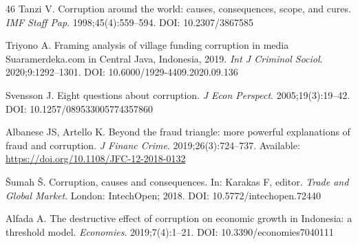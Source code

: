 \documentclass[3p,times,procedia]{elsarticle}
\begin{document}
\begin{thebibliography}{46}
Tanzi V. Corruption around the world: causes, consequences, scope, and cures. \textit{IMF Staff Pap}. 1998;45(4):559--594. DOI: 10.2307/3867585

Triyono A. Framing analysis of village funding corruption in media Suaramerdeka.com in Central Java, Indonesia, 2019. \textit{Int J Criminol Sociol}. 2020;9:1292--1301. DOI: 10.6000/1929-4409.2020.09.136

Svensson J. Eight questions about corruption. \textit{J Econ Perspect}. 2005;19(3):19--42. DOI: 10.1257/089533005774357860

Albanese JS, Artello K. Beyond the fraud triangle: more powerful explanations of fraud and corruption. \textit{J Financ Crime}. 2019;26(3):724--737. Available: \url{https://doi.org/10.1108/JFC-12-2018-0132}

\v{S}umah \v{S}. Corruption, causes and consequences. In: Karakas F, editor. \textit{Trade and Global Market}. London: IntechOpen; 2018. DOI: 10.5772/intechopen.72440

Alfada A. The destructive effect of corruption on economic growth in Indonesia: a threshold model. \textit{Economies}. 2019;7(4):1--21. DOI: 10.3390/economies7040111

\end{thebibliography}
\end{document}
